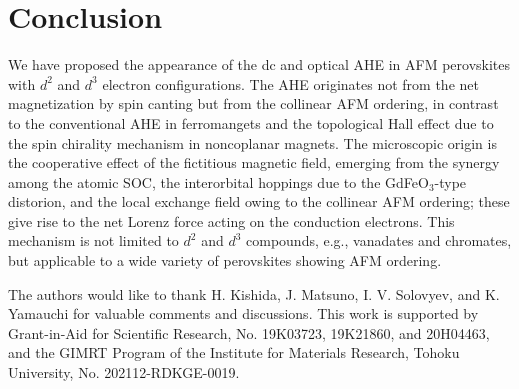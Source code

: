 \documentclass[aps,twocolumn,prb,preprintnumbers,amsmath,amssymb]{revtex4-2}
\begin{document}
\section{Conclusion}\label{conclusion}
We have proposed the appearance of the dc and optical AHE in AFM perovskites with $d^2$ and $d^3$ electron configurations.
The AHE originates not from the net magnetization by spin canting but from the collinear AFM ordering, 
in contrast to the conventional AHE in ferromangets and the topological Hall effect due to the spin chirality mechanism in noncoplanar magnets. 
The microscopic origin is the cooperative effect of the fictitious magnetic field, emerging from the synergy among the atomic SOC, the interorbital hoppings due to the GdFeO$_3$-type distorion, and the local exchange field owing to the collinear AFM ordering; these give rise to the net Lorenz force acting on the conduction electrons.
This mechanism is not limited to $d^2$ and $d^3$ compounds, e.g., vanadates and chromates, but applicable to a wide variety of perovskites showing AFM ordering.

\begin{acknowledgments}
The authors would like to thank H. Kishida, J. Matsuno, I. V. Solovyev, and K. Yamauchi for valuable comments and discussions. 
This work is supported by Grant-in-Aid for Scientific Research, No. 19K03723, 19K21860, and 20H04463, and the GIMRT Program of the Institute for Materials Research, Tohoku University, No. 202112-RDKGE-0019.
\end{acknowledgments}

\end{document}
